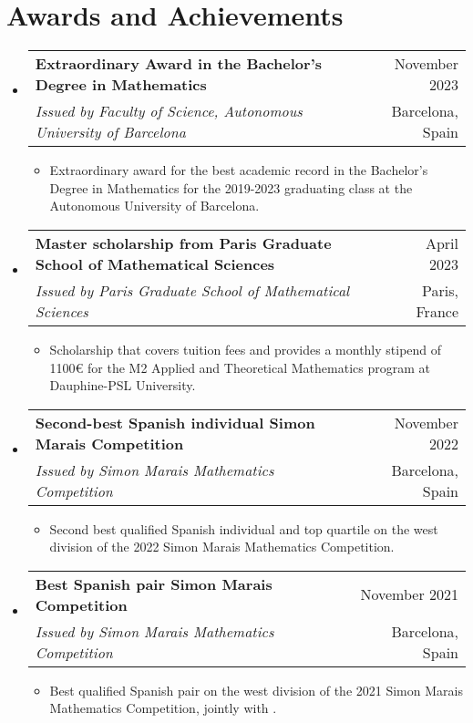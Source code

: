 \documentclass[a4paper,11pt]{article}
\makeatletter
\newcommand{\resumeQuadHeading}[4]{
  \item
  \begin{tabular*}{0.96\textwidth}[t]{l@{\extracolsep{\fill}}r}
    \textbf{#1} & \small #2 \\
    \small#3 & \small #4 \\
  \end{tabular*}
}
\newcommand{\resumeHeadingListStart}{
  \begin{itemize}[leftmargin=0.15in, label={}]
}
\newcommand{\resumeHeadingListEnd}{\end{itemize}}
\makeatother
\begin{document}
\section{Awards and Achievements}
\resumeHeadingListStart{}
\resumeQuadHeading{Extraordinary Award in the Bachelor's Degree in Mathematics}{November 2023}{\textit{Issued by Faculty of Science, Autonomous University of Barcelona}}{Barcelona, Spain}
\begin{itemize}[leftmargin=3em, itemsep=0.1em, topsep=2pt]
  \item \small Extraordinary award for the best academic record in the Bachelor's Degree in Mathematics for the 2019-2023 graduating class at the Autonomous University of Barcelona.
\end{itemize}
\resumeHeadingListEnd{}

\resumeHeadingListStart{}
\resumeQuadHeading{Master scholarship from Paris Graduate School of Mathematical Sciences}{April 2023}{\textit{Issued by Paris Graduate School of Mathematical Sciences}}{Paris, France}
\begin{itemize}[leftmargin=3em, itemsep=0.1em, topsep=2pt]
  \item \small Scholarship that covers tuition fees and provides a monthly stipend of 1100€ for the M2 Applied and Theoretical Mathematics program at Dauphine-PSL University.
\end{itemize}
\resumeHeadingListEnd{}

\resumeHeadingListStart{}
\resumeQuadHeading{Second-best Spanish individual Simon Marais Competition}{November 2022}{\textit{Issued by Simon Marais Mathematics Competition}}{Barcelona, Spain}
\begin{itemize}[leftmargin=3em, itemsep=0.1em, topsep=2pt]
  \item \small Second best qualified Spanish individual and top quartile on the west division of the 2022 Simon Marais Mathematics Competition.
\end{itemize}
\resumeHeadingListEnd{}

\resumeHeadingListStart{}
\resumeQuadHeading{Best Spanish pair Simon Marais Competition}{November 2021}{\textit{Issued by Simon Marais Mathematics Competition}}{Barcelona, Spain}
\begin{itemize}[leftmargin=3em, itemsep=0.1em, topsep=2pt]
  \item \small Best qualified Spanish pair on the west division of the 2021 Simon Marais Mathematics Competition, jointly with \href{https://github.com/misaelmalqui}{}.
\end{itemize}
\resumeHeadingListEnd{}
\end{document}
